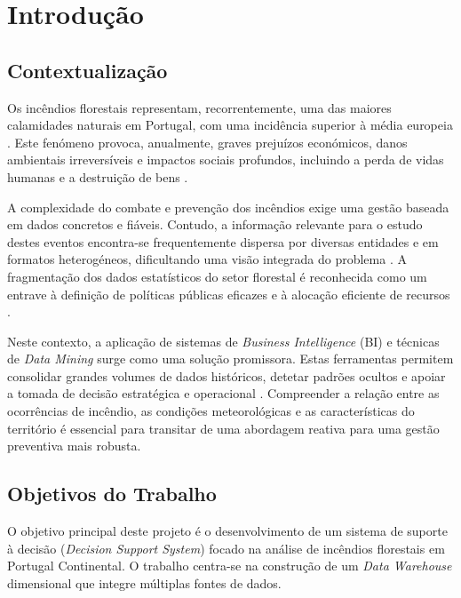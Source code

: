 \section{Introdução}

\subsection{Contextualização}
Os incêndios florestais representam, recorrentemente, uma das maiores calamidades naturais em Portugal, com uma incidência superior à média europeia \cite{pereira2016}. Este fenómeno provoca, anualmente, graves prejuízos económicos, danos ambientais irreversíveis e impactos sociais profundos, incluindo a perda de vidas humanas e a destruição de bens \cite{agif2024}.

A complexidade do combate e prevenção dos incêndios exige uma gestão baseada em dados concretos e fiáveis. Contudo, a informação relevante para o estudo destes eventos encontra-se frequentemente dispersa por diversas entidades e em formatos heterogéneos, dificultando uma visão integrada do problema \cite{almeida2023}. A fragmentação dos dados estatísticos do setor florestal é reconhecida como um entrave à definição de políticas públicas eficazes e à alocação eficiente de recursos \cite{oliveira2018}.

Neste contexto, a aplicação de sistemas de \textit{Business Intelligence} (BI) e técnicas de \textit{Data Mining} surge como uma solução promissora. Estas ferramentas permitem consolidar grandes volumes de dados históricos, detetar padrões ocultos e apoiar a tomada de decisão estratégica e operacional \cite{silva2023}. Compreender a relação entre as ocorrências de incêndio, as condições meteorológicas e as características do território é essencial para transitar de uma abordagem reativa para uma gestão preventiva mais robusta.

\subsection{Objetivos do Trabalho}
O objetivo principal deste projeto é o desenvolvimento de um sistema de suporte à decisão (\textit{Decision Support System}) focado na análise de incêndios florestais em Portugal Continental. O trabalho centra-se na construção de um \textit{Data Warehouse} dimensional que integre múltiplas fontes de dados.

